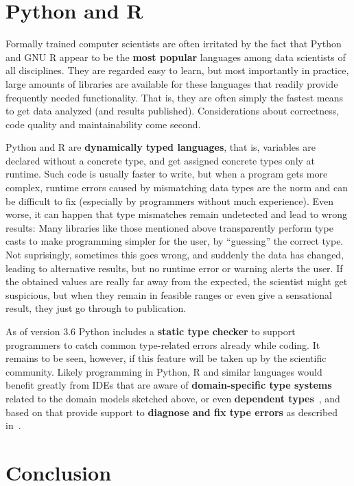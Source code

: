 \documentclass[sigplan,10pt,noacm]{acmart}
\begin{document}
\section{Python and R}

Formally trained computer scientists are often irritated by the fact that Python and GNU R appear to be the \textbf{most popular} languages among data scientists of all disciplines. They are regarded easy to learn, but most importantly in practice, large amounts of libraries are available for these languages that readily provide frequently needed functionality. That is, they are often simply the fastest means to get data analyzed (and results published). Considerations about correctness, code quality and maintainability come second.

Python and R are \textbf{dynamically typed languages}, that is, variables are declared without a concrete type, and get assigned concrete types only at runtime. Such code is usually faster to write, but when a program gets more complex, runtime errors caused by mismatching data types are the norm and can be difficult to fix (especially by programmers without much experience).
Even worse, it can happen that type mismatches remain undetected and lead to wrong results: Many libraries like those mentioned above transparently perform type casts to make programming simpler for the user, by \enquote{guessing} the correct type. Not suprisingly, sometimes this goes wrong, and suddenly the data has changed, leading to alternative results, but no runtime error or warning alerts the user. If the obtained values are really far away from the expected, the scientist might get suspicious, but when they remain in feasible ranges or even give a sensational result, they just go through to publication.

As of version 3.6 Python includes a \textbf{static type checker} to support programmers to catch common type-related errors already while coding. It remains to be seen, however, if this feature will be taken up by the scientific community. Likely programming in Python, R and similar languages would benefit greatly from IDEs that are aware of \textbf{domain-specific type systems} related to the domain models sketched above, or even \textbf{dependent types}~\cite{wouter}, and based on that provide support to \textbf{diagnose and fix type errors} as described in~\cite{jur}.


\section{Conclusion}
\end{document}
